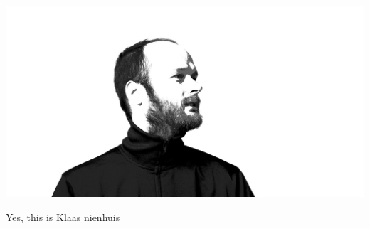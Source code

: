\documentclass[letterpaper,10pt,english]{sphinxmanual}
\begin{document}
\includegraphics{IMG_9971.jpg}

Yes, this is Klaas nienhuis



\renewcommand{\indexname}{Index}
\printindex
\end{document}
